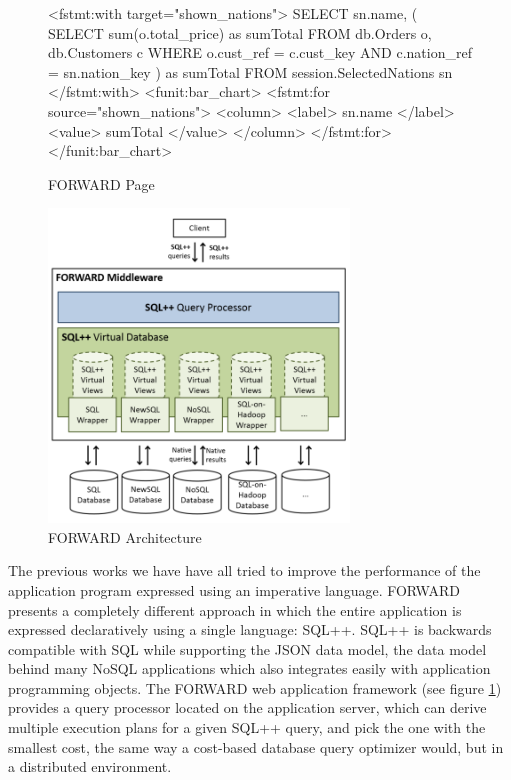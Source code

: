 \begin{figure}[h]
\centering
\begin{minipage}{0.45 \textwidth}
\centering
\begin{SQL}[basicstyle=\small, language=HTML]
<fstmt:with target="shown_nations">
SELECT sn.name, (
    SELECT sum(o.total_price) as sumTotal
    FROM db.Orders o, db.Customers c
    WHERE o.cust_ref = c.cust_key
    AND c.nation_ref = sn.nation_key
) as sumTotal
FROM session.SelectedNations sn
</fstmt:with>
<funit:bar_chart>
  <fstmt:for source="shown_nations">
    <column>
      <label> {sn.name} </label>
      <value> {sumTotal} </value>
    </column>
  </fstmt:for>
</funit:bar_chart>
\end{SQL}
\caption{FORWARD Page}
\label{fig:forward-code}
\end{minipage} \hfill
\begin{minipage}{0.45\textwidth}
\centering
\includegraphics[width=8cm]{images/architecture}
\caption{FORWARD Architecture}
\label{forward}
\end{minipage}\hfill
\end{figure}

The previous works we have have all tried to improve the performance of the application program expressed using an imperative language. FORWARD \cite{kian-win-ong:2014aa, yupeng-fu:2014aa} presents a completely different approach in which the entire application is expressed declaratively using a single language: SQL++. SQL++ is backwards compatible with SQL while supporting the JSON \cite{JSON} data model, the data model behind many NoSQL applications which also integrates easily with application programming objects. The FORWARD web application framework (see figure \ref{forward}) provides a query processor located on the application server, which can derive multiple execution plans for a given SQL++ query, and pick the one with the smallest cost, the same way a cost-based database query optimizer would, but in a distributed environment.

